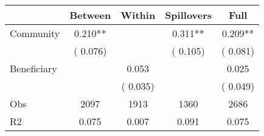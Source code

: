 
\begin{tabular}{l*{4}{c}}\hline&\multicolumn{1}{c}{Between}&\multicolumn{1}{c}{Within}&\multicolumn{1}{c}{Spillovers}&\multicolumn{1}{c}{Full}\\ \hline
 Community             &              0.210**      &                                               &        0.311** &         0.209**                            \\ 
                               &        (       0.076)           &                                       &       (       0.105)     &      (       0.081)                                           \\ 
 Beneficiary   &                                               &        0.053    &                                &             0.025                            \\ 
                               &                                               & (       0.035)                  &                                        &      (       0.049)                                           \\ 
\hline                                                                                                                                                                                                                                            
 Obs                   &               2097               &       1913                       &       1360                &              2686                                               \\ 
 R2                    &                      0.075              &              0.007                      &              0.091               &                     0.075                                              \\ 
\hline \end{tabular}                                                                                                                                                                                                              